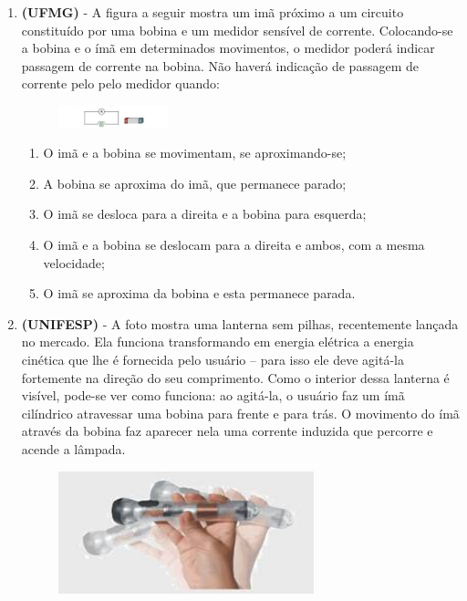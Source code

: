 \documentclass[12pt,letterpaper,fleqn]{article}
\begin{document}
\begin{enumerate}
        \item \textbf{(UFMG)} - A figura a seguir mostra um imã próximo a um circuito constituído por uma bobina e um medidor sensível de corrente. Colocando-se a bobina e o ímã em determinados movimentos, o medidor poderá indicar passagem de corrente na bobina. Não haverá indicação de passagem de corrente pelo pelo medidor quando:
        
        \begin{figure}[h]
            \centering
            \includegraphics[width = 0.3\textwidth]{ex_3.png}
        \end{figure}
        
        \begin{enumerate}
            \item O imã e a bobina se movimentam, se aproximando-se;
            \item A bobina se aproxima do imã, que permanece parado;
            \item O imã se desloca para a direita e a bobina para esquerda; 
            \item O imã e a bobina se deslocam para a direita e ambos, com a mesma velocidade;
            \item O imã se aproxima da bobina e esta permanece parada.
        \end{enumerate}
        
        \item \textbf{(UNIFESP)} - A foto mostra uma lanterna sem pilhas, recentemente lançada no mercado. Ela funciona transformando em energia elétrica a energia cinética que lhe é fornecida pelo usuário – para isso ele deve agitá-la fortemente na direção do seu comprimento. Como o interior dessa lanterna é visível, pode-se ver como funciona: ao agitá-la, o usuário faz um ímã cilíndrico atravessar uma bobina para frente e para trás. O movimento do ímã através da bobina faz aparecer nela uma corrente induzida que percorre e acende a lâmpada.
        
        \begin{figure}[h]
            \centering
            \includegraphics[width=0.7\textwidth]{ex_4.jpg}
        \end{figure}
        

\end{enumerate}
\end{document}
